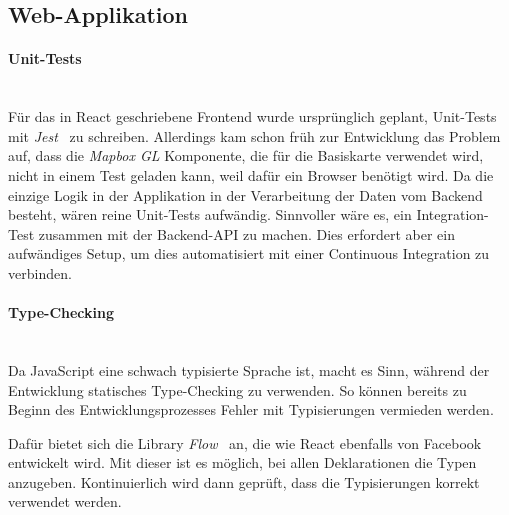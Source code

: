 \subsection{Web-Applikation}
\label{tests:Web-Applikation}

\paragraph{Unit-Tests}~\\
Für das in React geschriebene Frontend wurde ursprünglich geplant, Unit-Tests mit \emph{Jest}~\cite{jest} zu schreiben.
Allerdings kam schon früh zur Entwicklung das Problem auf, dass die \emph{Mapbox GL} Komponente, die für die Basiskarte verwendet wird, nicht in einem Test geladen kann, weil dafür ein Browser benötigt wird.
Da die einzige Logik in der Applikation in der Verarbeitung der Daten vom Backend besteht, wären reine Unit-Tests aufwändig.
Sinnvoller wäre es, ein Integration-Test zusammen mit der Backend-API zu machen.
Dies erfordert aber ein aufwändiges Setup, um dies automatisiert mit einer Continuous Integration zu verbinden.

\paragraph{Type-Checking}~\\
Da JavaScript eine schwach typisierte Sprache ist, macht es Sinn, während der Entwicklung statisches Type-Checking zu verwenden.
So können bereits zu Beginn des Entwicklungsprozesses Fehler mit Typisierungen vermieden werden.

Dafür bietet sich die Library \emph{Flow}~\cite{flow} an, die wie React ebenfalls von Facebook entwickelt wird.
Mit dieser ist es möglich, bei allen Deklarationen die Typen anzugeben.
Kontinuierlich wird dann geprüft, dass die Typisierungen korrekt verwendet werden.
